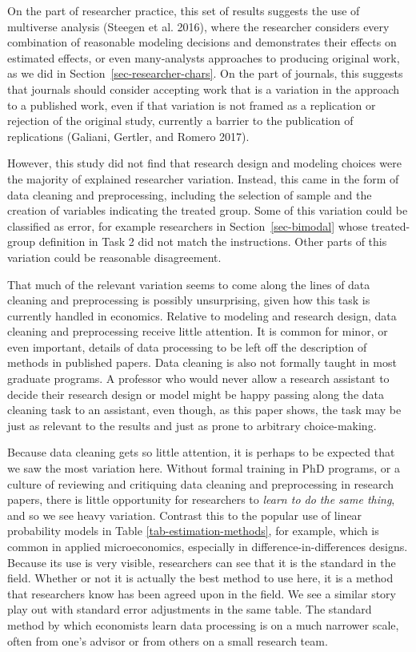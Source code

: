 \documentclass[
  letterpaper,
  DIV=11,
  numbers=noendperiod]{scrartcl}
\begin{document}
On the part of researcher practice, this set of results suggests the use
of multiverse analysis (Steegen et al. 2016), where the researcher
considers every combination of reasonable modeling decisions and
demonstrates their effects on estimated effects, or even many-analysts
approaches to producing original work, as we did in
Section~\ref{sec-researcher-chars}. On the part of journals, this
suggests that journals should consider accepting work that is a
variation in the approach to a published work, even if that variation is
not framed as a replication or rejection of the original study,
currently a barrier to the publication of replications (Galiani,
Gertler, and Romero 2017).

However, this study did not find that research design and modeling
choices were the majority of explained researcher variation. Instead,
this came in the form of data cleaning and preprocessing, including the
selection of sample and the creation of variables indicating the treated
group. Some of this variation could be classified as error, for example
researchers in Section~\ref{sec-bimodal} whose treated-group definition
in Task 2 did not match the instructions. Other parts of this variation
could be reasonable disagreement.

That much of the relevant variation seems to come along the lines of
data cleaning and preprocessing is possibly unsurprising, given how this
task is currently handled in economics. Relative to modeling and
research design, data cleaning and preprocessing receive little
attention. It is common for minor, or even important, details of data
processing to be left off the description of methods in published
papers. Data cleaning is also not formally taught in most graduate
programs. A professor who would never allow a research assistant to
decide their research design or model might be happy passing along the
data cleaning task to an assistant, even though, as this paper shows,
the task may be just as relevant to the results and just as prone to
arbitrary choice-making.

Because data cleaning gets so little attention, it is perhaps to be
expected that we saw the most variation here. Without formal training in
PhD programs, or a culture of reviewing and critiquing data cleaning and
preprocessing in research papers, there is little opportunity for
researchers to \emph{learn to do the same thing}, and so we see heavy
variation. Contrast this to the popular use of linear probability models
in Table \ref{tab-estimation-methods}, for example, which is common in
applied microeconomics, especially in difference-in-differences designs.
Because its use is very visible, researchers can see that it is the
standard in the field. Whether or not it is actually the best method to
use here, it is a method that researchers know has been agreed upon in
the field. We see a similar story play out with standard error
adjustments in the same table. The standard method by which economists
learn data processing is on a much narrower scale, often from one's
advisor or from others on a small research team.
\end{document}
